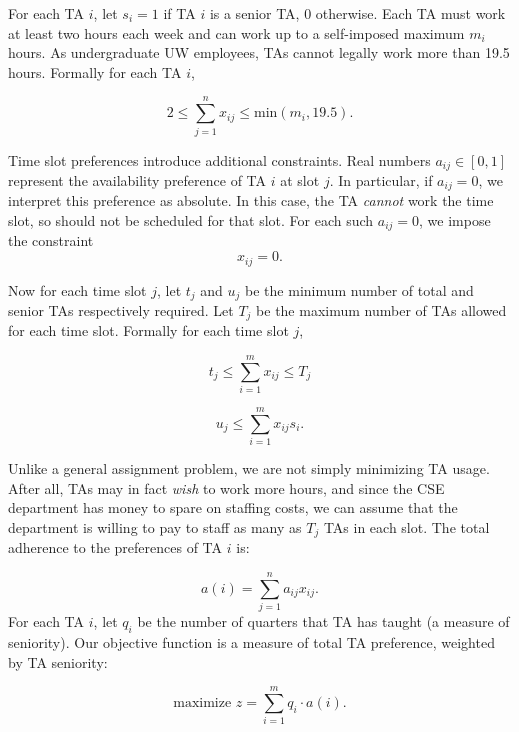 \documentclass{article}
\begin{document}
\begin{multicols}{2}
For each TA $i$, let $s_i = 1$ if TA $i$ is a senior TA, 0 otherwise. Each TA must work at least two hours each week and can work up to a self-imposed maximum $m_i$ hours. As undergraduate UW employees, TAs cannot legally work more than 19.5 hours. Formally for each TA $i$,

\begin{equation}
2 \leq \sum_{j=1}^{n}x_{ij} \leq \textrm{min}(m_i, 19.5).
\end{equation}

Time slot preferences introduce additional constraints. Real numbers $a_{ij} \in [0,1]$ represent the availability preference of TA $i$ at slot $j$. In particular, if $a_{ij} = 0$, we interpret this preference as absolute. In this case, the TA \textit{cannot} work the time slot, so should not be scheduled for that slot. For each such $a_{ij} = 0$, we impose the constraint
\begin{equation}
x_{ij} = 0.
\end{equation}

Now for each time slot $j$, let $t_j$ and $u_j$ be the minimum number of total and senior TAs respectively required. Let $T_j$ be the maximum number of TAs allowed for each time slot. Formally for each time slot $j$,

\begin{equation}
t_j \leq \sum_{i=1}^{m}x_{ij} \leq T_j
\end{equation}

\begin{equation}
u_j \leq \sum_{i=1}^{m}x_{ij}s_i.
\end{equation}

Unlike a general assignment problem, we are not simply minimizing TA usage. After all, TAs may in fact \textit{wish} to work more hours, and since the CSE department has money to spare on staffing costs, we can assume that the department is willing to pay to staff as many as $T_j$ TAs in each slot. The total adherence to the preferences of TA $i$ is:

\begin{equation}
a(i) = \sum_{j=1}^na_{ij}x_{ij}.
\end{equation}
For each TA $i$, let $q_i$ be the number of quarters that TA has taught (a measure of seniority). Our objective function is a measure of total TA preference, weighted by TA seniority:

\begin{equation}
\textrm{maximize } z = \sum_{i=1}^mq_i\cdot a(i).
\end{equation}


\end{multicols}
\end{document}
